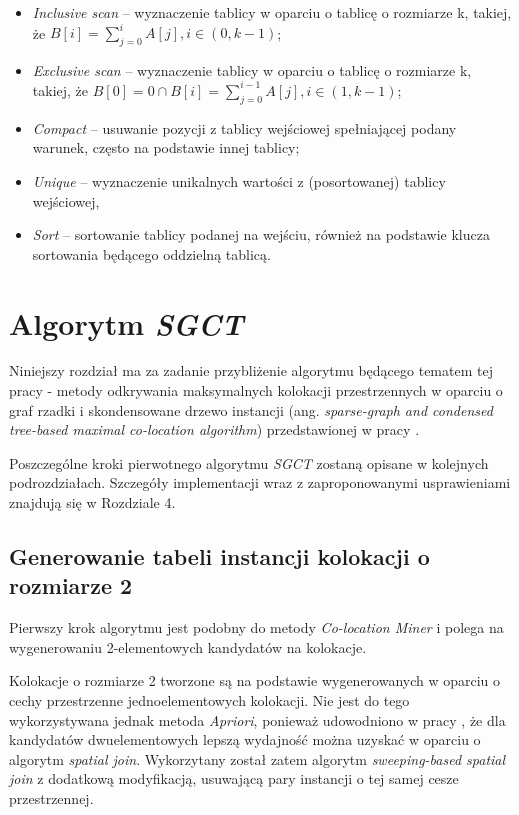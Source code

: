 \documentclass[12pt]{article}
\newcounter{algorytm}
\begin{document}
\begin{itemize}
\item \textit{Inclusive scan} – wyznaczenie tablicy w oparciu o tablicę o rozmiarze k, takiej, że $ B[i] = \sum\limits_{j=0}^{i} A[j], i \in (0, k-1) $;
\item \textit{Exclusive scan} – wyznaczenie tablicy w oparciu o tablicę o rozmiarze k, takiej, że $ B[0] = 0 \cap B[i] = \sum\limits_{j=0}^{i-1} A[j], i \in (1,k-1) $;
\item \textit{Compact} – usuwanie pozycji z tablicy wejściowej spełniającej podany warunek, często na podstawie innej tablicy;
\item \textit{Unique} – wyznaczenie unikalnych wartości z (posortowanej) tablicy wejściowej,
\item \textit{Sort} – sortowanie tablicy podanej na wejściu, również na podstawie klucza sortowania będącego oddzielną tablicą.
\end{itemize}
\newpage

\section{Algorytm \textit{SGCT}}
\label{sec:china}

Niniejszy rozdział ma za zadanie przybliżenie algorytmu będącego tematem tej pracy - metody odkrywania maksymalnych kolokacji przestrzennych w oparciu o graf rzadki i skondensowane drzewo instancji (ang. \textit{sparse-graph and condensed tree-based maximal co-location algorithm}) przedstawionej w pracy \cite{chinczyki}. 

Poszczególne kroki pierwotnego algorytmu \textit{SGCT} zostaną opisane w kolejnych podrozdziałach. Szczegóły implementacji wraz z zaproponowanymi usprawieniami znajdują się w Rozdziale 4.

\subsection{Generowanie tabeli instancji kolokacji o rozmiarze 2}

Pierwszy krok algorytmu jest podobny do metody \textit{Co-location Miner} i polega na wygenerowaniu 2-elementowych kandydatów na kolokacje. 

Kolokacje o rozmiarze 2 tworzone są na podstawie wygenerowanych w oparciu o cechy przestrzenne jednoelementowych kolokacji. Nie jest do tego wykorzystywana jednak metoda \textit{Apriori}, ponieważ udowodniono w pracy \cite{huang}, że dla kandydatów dwuelementowych lepszą wydajność można uzyskać w oparciu o algorytm \textit{spatial join}. Wykorzytany został zatem algorytm \textit{sweeping-based spatial join} \cite{spatial} z dodatkową modyfikacją, usuwającą pary instancji o tej samej cesze przestrzennej. 
\end{document}

